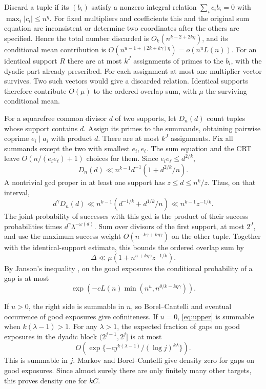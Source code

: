 \documentclass[11pt]{article}
\begin{document}
Discard a tuple if its \((b_i)\) satisfy a nonzero integral
relation \(\sum_i c_i b_i=0\) with \(\max_i|c_i|\le n^\eta\).
For fixed multipliers and coefficients this and the original sum
equation are inconsistent or determine two coordinates after the
others are specified. Hence the total number discarded is
\(O_k(n^{k-2+2k\eta})\), and its conditional mean contribution is
\(O(n^{u-1+(2k+k\gamma)\eta})=o(n^u L(n))\).
For an identical support \(R\) there are at most \(k^J\) assignments
of primes to the \(b_i\), with the dyadic part already prescribed.
For each assignment at most one multiplier vector survives.
Two such vectors would give a discarded relation. Identical
supports therefore contribute \(O(\mu)\) to the ordered overlap
sum, with \(\mu\) the surviving conditional mean.

For a squarefree common divisor \(d\) of two supports, let
\(D_n(d)\) count tuples whose support contains \(d\).
Assign its primes to the summands, obtaining pairwise coprime
\(e_i\mid a_i\) with product \(d\). There are at most \(k^J\)
assignments. Fix all summands except the two with smallest
\(e_i,e_\ell\). The sum equation and the CRT leave
\(O(n/(e_ie_\ell)+1)\) choices for them. Since
\(e_ie_\ell\le d^{2/k}\),
\[
           D_n(d)\ll n^{k-1}d^{-1}(1+d^{2/k}/n).
\]
A nontrivial gcd proper in at least one support has
\(z\le d\le n^k/z\). Thus, on that interval,
\[
        d^\gamma D_n(d)
 \ll n^{k-1}(d^{-1/k}+d^{1/k}/n)\ll n^{k-1}z^{-1/k}.
\]
The joint probability of successes with this gcd is the product
of their success probabilities times \(d^\gamma\lambda^{-\omega(d)}\).
Sum over divisors of the first support, at most \(2^J\), and use
the maximum success weight \(O(n^{-k\gamma+k\eta\gamma})\) on the
other tuple. Together with the identical-support estimate, this
bounds the ordered overlap sum by
\[
             \Delta\ll\mu(1+n^{u+k\eta\gamma}z^{-1/k}).
\]
By Janson's inequality \cite[formula (2)]{JW}, on the good exposures
the conditional probability of a gap is at most
\begin{equation}\label{eq:upper}
       \exp\!\left(-c L(n)\min(n^u,n^{\theta/k-k\eta\gamma})\right).
\end{equation}

If \(u>0\), the right side is summable in \(n\), so
Borel--Cantelli and eventual occurrence of good exposures give
cofiniteness. If \(u=0\), \eqref{eq:upper} is summable when
\(k(\lambda-1)>1\). For any \(\lambda>1\), the expected fraction
of gaps on good exposures in the dyadic block \((2^{j-1},2^j]\)
is at most
\[
 O\!\left(\exp\{-c j^{k(\lambda-1)}/(\log j)^{k\lambda}\}\right).
\]
This is summable in \(j\). Markov and Borel--Cantelli give density
zero for gaps on good exposures. Since almost surely there are
only finitely many other targets, this proves density one for \(kC\).
\end{document}
